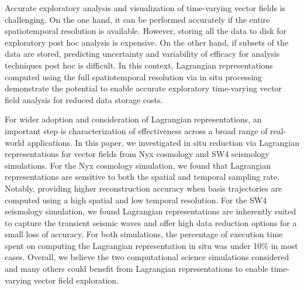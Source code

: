 Accurate exploratory analysis and visualization of time-varying vector fields is challenging.
%
On the one hand, it can be performed accurately if the entire spatiotemporal resolution is available.
%
However, storing all the data to disk for exploratory post hoc analysis is expensive.
%
On the other hand, if subsets of the data are stored, predicting uncertainty and variability of efficacy for analysis techniques post hoc is difficult.
%
In this context, Lagrangian representations computed using the full spatiotemporal resolution via in situ processing demonstrate the potential to enable accurate exploratory time-varying vector field analysis for reduced data storage costs.



For wider adoption and consideration of Lagrangian representations, an important step is characterization of effectiveness across a broad range of real-world applications.
%
In this paper, we investigated in situ reduction via Lagrangian representations for vector fields from Nyx cosmology and SW4 seismology simulations.
%
For the Nyx cosmology simulation, we found that Lagrangian representations are sensitive to both the spatial and temporal sampling rate.
%
Notably, providing higher reconstruction accuracy when basis trajectories are computed using a high spatial and low temporal resolution.
%
For the SW4 seismology simulation, we found Lagrangian representations are inherently suited to capture the transient seismic waves and offer high data reduction options for a small loss of accuracy.
%
For both simulations, the percentage of execution time spent on computing the Lagrangian representation in situ was under 10\% in most cases.
%
Overall, we believe the two computational science simulations considered and many others could benefit from Lagrangian representations to enable time-varying vector field exploration. 
